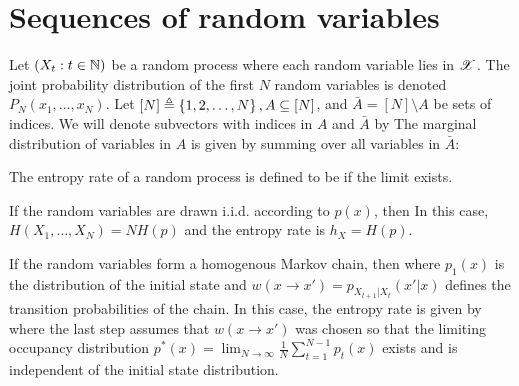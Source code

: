 \documentclass[letterpaper,10pt,english]{article}
\begin{document}
\section{Sequences of random variables}
Let $(X_t: t \in \mathbb{N})$ be a random process where each random variable lies in $\mathscr{X}$. 
The joint probability distribution of the first $N$ random variables is denoted 
$P_N (x_1, \dots , x_N)$. 
Let $[N] \triangleq \left\{1,2, \dots,N\right\}, A \subseteq [N]$, and $\bar{A} = [N]\setminus A$ be sets of indices. 
We will denote subvectors with indices in $A$ and $\bar{A}$ by
The marginal distribution of variables in $A$ is given by summing over all variables in $\bar{A}$: 
\begin{defn}
The entropy rate of a random process is defined to be
if the limit exists.
\end{defn} 
\begin{shaded*}\begin{exmp}
If the random variables are drawn i.i.d. according to $p(x)$, then 
In this case, $H (X_1, \dots,X_N) = NH (p)$ and the entropy rate is $h_X = H (p)$.
\end{exmp}\end{shaded*} 
\begin{shaded*}\begin{exmp}
If the random variables form a homogenous Markov chain, then 
where $p_1(x)$ is the distribution of the initial state and $w(x \to x') = p_{X_{t+1}|X_t} (x'|x)$ defines the transition probabilities of the chain. 
In this case, the entropy rate is given by
where the last step assumes that $w(x \to x')$ was chosen so that the limiting occupancy
distribution $p^{\ast}(x) = \lim_{N \to \infty}\frac{1}{N} \sum_{t=1}^{N-1}p_t(x)$ exists and is independent of the initial state distribution. 
\end{exmp}\end{shaded*}
\end{document}
